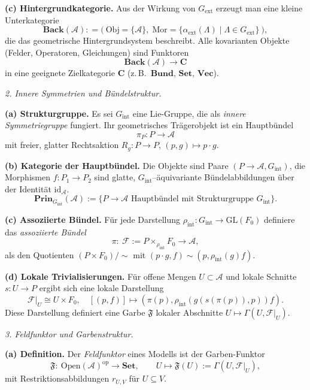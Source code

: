 \documentclass[10pt, letterpaper]{article}
\begin{document}
\textbf{(c) Hintergrundkategorie.}
Aus der Wirkung von $G_{\mathrm{ext}}$ erzeugt man eine kleine Unterkategorie
\[
\mathbf{Back}(\mathcal A):
=\big(\ \mathrm{Obj}=\{\mathcal A\},\;
\mathrm{Mor}=\{\alpha_{\mathrm{ext}}(\Lambda)\mid \Lambda\in G_{\mathrm{ext}}\}\ \big),
\]
die das geometrische Hintergrundsystem beschreibt.
Alle kovarianten Objekte (Felder, Operatoren, Gleichungen) sind Funktoren
\[
\mathbf{Back}(\mathcal A)\longrightarrow\mathbf{C}
\]
in eine geeignete Zielkategorie $\mathbf{C}$ (z.\,B.\ $\mathbf{Bund}$, $\mathbf{Set}$, $\mathbf{Vec}$).

\bigskip
\emph{2. Innere Symmetrien und Bündelstruktur.}

\textbf{(a) Strukturgruppe.}
Es sei $G_{\mathrm{int}}$ eine Lie-Gruppe, die als \emph{innere Symmetriegruppe}
fungiert. Ihr geometrisches Trägerobjekt ist ein Hauptbündel
\[
\pi_P:P\longrightarrow \mathcal A
\]
mit freier, glatter Rechtsaktion $R_g:P\to P$, $(p,g)\mapsto p\cdot g$.

\textbf{(b) Kategorie der Hauptbündel.}
Die Objekte sind Paare $(P\to\mathcal A,G_{\mathrm{int}})$,
die Morphismen $f:P_1\to P_2$ sind glatte, $G_{\mathrm{int}}$–äquivariante
Bündelabbildungen über der Identität $\mathrm{id}_\mathcal A$.
\[
\mathbf{Prin}_{G_{\mathrm{int}}}(\mathcal A)
:=\big\{P\to\mathcal A\text{ Hauptbündel mit Strukturgruppe }G_{\mathrm{int}}\big\}.
\]

\textbf{(c) Assoziierte Bündel.}
Für jede Darstellung $\rho_{\mathrm{int}}:G_{\mathrm{int}}\to \mathrm{GL}(F_0)$
definiere das \emph{assoziierte Bündel}
\[
\pi:\ \mathcal F := P\times_{\rho_{\mathrm{int}}}F_0 \longrightarrow \mathcal A,
\]
als den Quotienten $(P\times F_0)/{\sim}$ mit $(p\cdot g, f)\sim(p,\rho_{\mathrm{int}}(g)f)$.

\textbf{(d) Lokale Trivialisierungen.}
Für offene Mengen $U\subset \mathcal A$ und lokale Schnitte $s:U\to P$ ergibt sich
eine lokale Darstellung
\[
\mathcal F|_U \cong U\times F_0,\quad
[(p,f)]\mapsto (\pi(p), \rho_{\mathrm{int}}(g(s(\pi(p)),p))f).
\]
Diese Darstellung definiert eine Garbe $\mathfrak F$ lokaler Abschnitte
$U\mapsto\Gamma(U,\mathcal F|_U)$.

\bigskip
\emph{3. Feldfunktor und Garbenstruktur.}

\textbf{(a) Definition.}
Der \emph{Feldfunktor} eines Modells ist der Garben-Funktor
\[
\mathfrak F:\ \mathrm{Open}(\mathcal A)^{\mathrm{op}}\longrightarrow\mathbf{Set},
\qquad
U\longmapsto \mathfrak F(U):=\Gamma(U,\mathcal F|_U),
\]
mit Restriktionsabbildungen $r_{U,V}$ für $U\subseteq V$.
\end{document}
